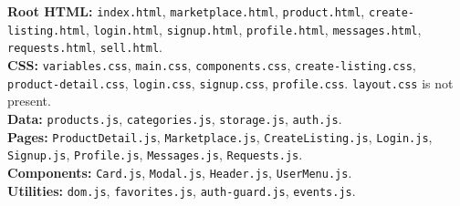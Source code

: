 \documentclass[10pt]{article}
\newcommand{\code}[1]{\texttt{#1}}
\begin{document}
\begin{tcolorbox}[colback=softlavender,colframe=bordergray,title=Repository Map,fonttitle=\bfseries,coltitle=darktext,boxrule=0.5pt]
\small
\textbf{Root HTML:} \code{index.html}, \code{marketplace.html}, \code{product.html}, \code{create-listing.html}, \code{login.html}, \code{signup.html}, \code{profile.html}, \code{messages.html}, \code{requests.html}, \code{sell.html}.\\
\textbf{CSS:} \code{variables.css}, \code{main.css}, \code{components.css}, \code{create-listing.css}, \code{product-detail.css}, \code{login.css}, \code{signup.css}, \code{profile.css}. \code{layout.css} is not present.\\
\textbf{Data:} \code{products.js}, \code{categories.js}, \code{storage.js}, \code{auth.js}.\\
\textbf{Pages:} \code{ProductDetail.js}, \code{Marketplace.js}, \code{CreateListing.js}, \code{Login.js}, \code{Signup.js}, \code{Profile.js}, \code{Messages.js}, \code{Requests.js}.\\
\textbf{Components:} \code{Card.js}, \code{Modal.js}, \code{Header.js}, \code{UserMenu.js}.\\
\textbf{Utilities:} \code{dom.js}, \code{favorites.js}, \code{auth-guard.js}, \code{events.js}.
\end{tcolorbox}
\end{document}
